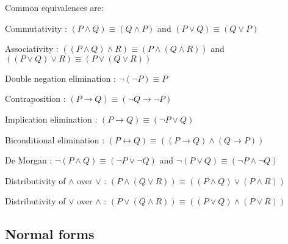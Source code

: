 \begin{description}
       Common equivalences are:
       \begin{descriptionlist}
            \footnotesize
            \item[Commutativity]: $(P \land Q) \equiv (Q \land P)$ and $(P \vee Q) \equiv (Q \vee P)$
            \item[Associativity]: $((P \land Q) \land R) \equiv (P \land (Q \land R))$
                and $((P \vee Q) \vee R) \equiv (P \vee (Q \vee R))$
            \item[Double negation elimination]: $\lnot(\lnot P) \equiv P$
            \item[Contraposition]: $(P \rightarrow Q) \equiv (\lnot Q \rightarrow \lnot P)$
            \item[Implication elimination]: $(P \rightarrow Q) \equiv (\lnot P \vee Q)$
            \item[Biconditional elimination]: $(P \leftrightarrow Q) \equiv ((P \rightarrow Q) \land (Q \rightarrow P))$
            \item[De Morgan]: $\lnot(P \land Q) \equiv (\lnot P \vee \lnot Q)$ and $\lnot(P \vee Q) \equiv (\lnot P \land \lnot Q)$
            \item[Distributivity of $\land$ over $\vee$]: $(P \land (Q \vee R)) \equiv ((P \land Q) \vee (P \land R))$
            \item[Distributivity of $\vee$ over $\land$]: $(P \vee (Q \land R)) \equiv ((P \vee Q) \land (P \vee R))$
       \end{descriptionlist}
\end{description}


\subsection{Normal forms}

